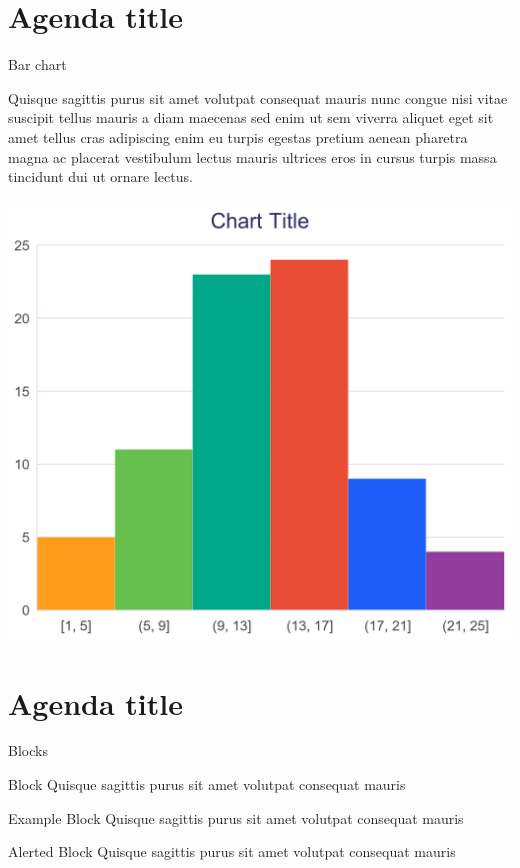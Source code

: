 \documentclass[aspectratio=169, 12pt]{beamer} %
\begin{document}
  \section{Agenda title}
  \begin{frame}{Bar chart}
      \begin{minipage}[l]{0.47\textwidth}
        \raggedright
        Quisque sagittis purus sit amet volutpat consequat mauris nunc congue nisi vitae suscipit tellus mauris a diam maecenas sed enim ut sem viverra aliquet eget sit amet tellus cras adipiscing enim eu turpis egestas pretium aenean pharetra magna ac placerat vestibulum lectus mauris ultrices eros in cursus turpis massa tincidunt dui ut ornare lectus.
      \end{minipage}
      \hfill
      \begin{minipage}{0.5\textwidth}
        \centering
        \includegraphics[width=\textwidth]{bar_chart}
      \end{minipage}
  \end{frame}

  \section{Agenda title}
  \begin{frame}{Blocks}
    \begin{block}{Block}
      Quisque sagittis purus sit amet volutpat consequat mauris
    \end{block}

    \begin{exampleblock}{Example Block}
      Quisque sagittis purus sit amet volutpat consequat mauris
     
    \end{exampleblock}

    \begin{alertblock}{Alerted Block}
      Quisque sagittis purus sit amet volutpat consequat mauris      
    \end{alertblock}
  \end{frame}
  
  \begin{frame}[plain]
    \questionspage
  \end{frame}

  \begin{frame}[plain]
    \thankyoupage
  \end{frame}
\end{document}
